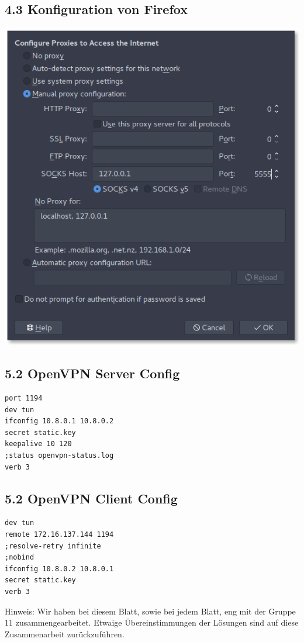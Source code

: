 \documentclass[10pt,a4paper]{article}
\begin{document}
\subsection*{4.3 Konfiguration von Firefox}
\includegraphics[width=\textwidth]{images/image.png}

\subsection*{5.2 OpenVPN Server Config}
\begin{verbatim}
port 1194
dev tun
ifconfig 10.8.0.1 10.8.0.2
secret static.key
keepalive 10 120
;status openvpn-status.log
verb 3
\end{verbatim}
\subsection*{5.2 OpenVPN Client Config}
\begin{verbatim}
dev tun
remote 172.16.137.144 1194
;resolve-retry infinite
;nobind
ifconfig 10.8.0.2 10.8.0.1
secret static.key
verb 3
\end{verbatim}

Hinweis: Wir haben bei diesem Blatt, sowie bei jedem Blatt, eng mit der Gruppe 11 zusammengearbeitet. Etwaige Übereinstimmungen der Lösungen sind auf diese Zusammenarbeit zurückzuführen.
\end{document}
